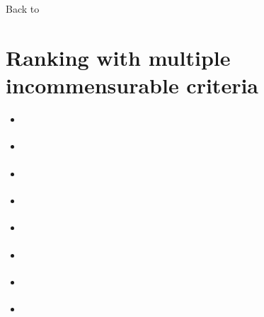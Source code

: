 \documentclass[a4paper,12pt,english]{sphinxhowto}
\begin{document}
Back to {\hyperref[\detokenize{tutorial:tutorial-label}]{}}


\section{Ranking with multiple incommensurable criteria}
\label{\detokenize{tutorial:ranking-with-multiple-incommensurable-criteria}}\label{\detokenize{tutorial:ranking-tutorial-label}}
\begin{sphinxShadowBox}
\begin{itemize}
\item {} 
\label{\detokenize{tutorial:id191}}{\hyperref[\detokenize{tutorial:the-ranking-problem}]{}}

\item {} 
\label{\detokenize{tutorial:id192}}{\hyperref[\detokenize{tutorial:the-copeland-ranking}]{}}

\item {} 
\label{\detokenize{tutorial:id193}}{\hyperref[\detokenize{tutorial:the-netflows-ranking}]{}}

\item {} 
\label{\detokenize{tutorial:id194}}{\hyperref[\detokenize{tutorial:kemeny-rankings}]{}}

\item {} 
\label{\detokenize{tutorial:id195}}{\hyperref[\detokenize{tutorial:slater-rankings}]{}}

\item {} 
\label{\detokenize{tutorial:id196}}{\hyperref[\detokenize{tutorial:kohler-s-ranking-by-choosing-rule}]{}}

\item {} 
\label{\detokenize{tutorial:id197}}{\hyperref[\detokenize{tutorial:tideman-s-ranked-pairs-rule}]{}}

\item {} 
\label{\detokenize{tutorial:id198}}{\hyperref[\detokenize{tutorial:ranking-big-performance-tableaux}]{}}

\end{itemize}
\end{sphinxShadowBox}
\end{document}
